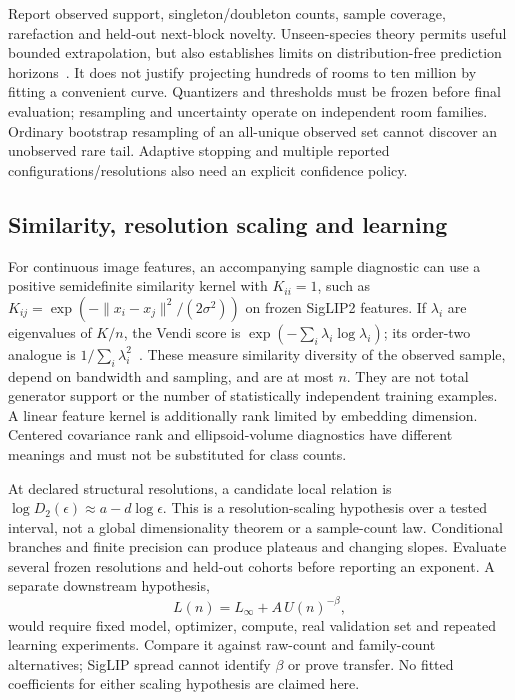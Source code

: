 \documentclass{article}
\begin{document}
Report observed support, singleton/doubleton counts, sample coverage, rarefaction
and held-out next-block novelty. Unseen-species theory permits useful bounded
extrapolation, but also establishes limits on distribution-free prediction
horizons~\cite{orlitsky2016}. It does not justify projecting hundreds of rooms
to ten million by fitting a convenient curve. Quantizers and thresholds must be
frozen before final evaluation; resampling and uncertainty operate on independent
room families. Ordinary bootstrap resampling of an all-unique observed set cannot
discover an unobserved rare tail. Adaptive stopping and multiple reported
configurations/resolutions also need an explicit confidence policy.

\subsection{Similarity, resolution scaling and learning}
For continuous image features, an accompanying sample diagnostic can use a
positive semidefinite similarity kernel with $K_{ii}=1$, such as
$K_{ij}=\exp(-\|x_i-x_j\|^2/(2\sigma^2))$ on frozen SigLIP2 features.
If $\lambda_i$ are eigenvalues of $K/n$, the Vendi score is
$\exp(-\sum_i\lambda_i\log\lambda_i)$; its order-two analogue is
$1/\sum_i\lambda_i^2$~\cite{friedman2023,pasarkar2024}. These measure similarity
diversity of the observed sample, depend on bandwidth and sampling, and are at
most $n$. They are not total generator support or the number of statistically
independent training examples. A linear feature kernel is additionally rank
limited by embedding dimension. Centered covariance rank and ellipsoid-volume
diagnostics have different meanings and must not be substituted for class counts.

At declared structural resolutions, a candidate local relation is
$\log D_2(\epsilon)\approx a-d\log\epsilon$. This is a resolution-scaling
hypothesis over a tested interval, not a global dimensionality theorem or a
sample-count law. Conditional branches and finite precision can produce plateaus
and changing slopes. Evaluate several frozen resolutions and held-out cohorts
before reporting an exponent. A separate downstream hypothesis,
\begin{equation}
 L(n)=L_\infty+A\,U(n)^{-\beta},
 \label{eq:capacity-learning}
\end{equation}
would require fixed model, optimizer, compute, real validation set and repeated
learning experiments. Compare it against raw-count and family-count alternatives;
SigLIP spread cannot identify $\beta$ or prove transfer. No fitted coefficients
for either scaling hypothesis are claimed here.
\end{document}

